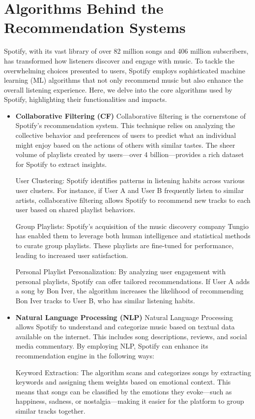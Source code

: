 \documentclass[12pt,a4paper]{article}
\begin{document}
\section{Algorithms Behind the Recommendation Systems}
Spotify, with its vast library of over 82 million songs and 406 million subscribers, has transformed how listeners discover and engage with music. To tackle the overwhelming choices presented to users, Spotify employs sophisticated machine learning (ML) algorithms that not only recommend music but also enhance the overall listening experience. Here, we delve into the core algorithms used by Spotify, highlighting their functionalities and impacts.
\begin{itemize}
 \item \textbf{Collaborative Filtering (CF)}
Collaborative filtering is the cornerstone of Spotify's recommendation system. This technique relies on analyzing the collective behavior and preferences of users to predict what an individual might enjoy based on the actions of others with similar tastes. The sheer volume of playlists created by users—over 4 billion—provides a rich dataset for Spotify to extract insights.

User Clustering: Spotify identifies patterns in listening habits across various user clusters. For instance, if User A and User B frequently listen to similar artists, collaborative filtering allows Spotify to recommend new tracks to each user based on shared playlist behaviors.

Group Playlists: Spotify's acquisition of the music discovery company Tungio has enabled them to leverage both human intelligence and statistical methods to curate group playlists. These playlists are fine-tuned for performance, leading to increased user satisfaction.

Personal Playlist Personalization: By analyzing user engagement with personal playlists, Spotify can offer tailored recommendations. If User A adds a song by Bon Iver, the algorithm increases the likelihood of recommending Bon Iver tracks to User B, who has similar listening habits.

 \item \textbf{Natural Language Processing (NLP)}
Natural Language Processing allows Spotify to understand and categorize music based on textual data available on the internet. This includes song descriptions, reviews, and social media commentary. By employing NLP, Spotify can enhance its recommendation engine in the following ways:

Keyword Extraction: The algorithm scans and categorizes songs by extracting keywords and assigning them weights based on emotional context. This means that songs can be classified by the emotions they evoke—such as happiness, sadness, or nostalgia—making it easier for the platform to group similar tracks together.


\end{itemize}
\end{document}
